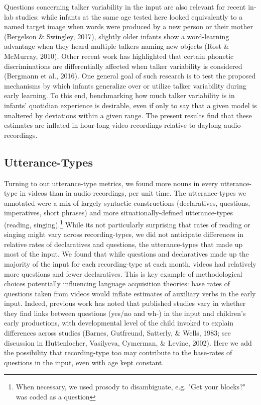 \documentclass[man]{apa6}
\theoremstyle{definition}
\theoremstyle{definition}
\theoremstyle{definition}
\theoremstyle{remark}
\begin{document}
Questions concerning talker variability in the input are also relevant
for recent in-lab studies: while infants at the same age tested here
looked equivalently to a named target image when words were produced by
a new person or their mother (Bergelson \& Swingley, 2017), slightly
older infants show a word-learning advantage when they heard multiple
talkers naming new objects (Rost \& McMurray, 2010). Other recent work
has highlighted that certain phonetic discriminations are differentially
affected when talker variability is considered (Bergmann et al., 2016).
One general goal of such research is to test the proposed mechanisms by
which infants generalize over or utilize talker variability during early
learning. To this end, benchmarking how much talker variability is in
infants' quotidian experience is desirable, even if only to say that a
given model is unaltered by deviations within a given range. The present
results find that these estimates are inflated in hour-long
video-recordings relative to daylong audio-recordings.

\subsection{Utterance-Types}\label{utterance-types}

Turning to our utterance-type metrics, we found more nouns in every
utterance-type in videos than in audio-recordings, per unit time. The
utterance-types we annotated were a mix of largely syntactic
constructions (declaratives, questions, imperatives, short phrases) and
more situationally-defined utterance-types (reading,
singing).\footnote{When necessary, we used prosody to disambiguate, e.g. "Get your blocks?" was coded as a question}
While its not particularly surprising that rates of reading or singing
might vary across recording-types, we did not anticipate differences in
relative rates of declaratives and questions, the utterance-types that
made up most of the input. We found that while questions and
declaratives made up the majority of the input for each recording-type
at each month, videos had relatively more questions and fewer
declaratives. This is key example of methodological choices potentially
influencing language acquisition theories: base rates of questions taken
from videos would inflate estimates of auxiliary verbs in the early
input. Indeed, previous work has noted that published studies vary in
whether they find links between questions (yes/no and wh-) in the input
and children's early productions, with developmental level of the child
invoked to explain differences across studies (Barnes, Gutfreund,
Satterly, \& Wells, 1983; see discussion in Huttenlocher, Vasilyeva,
Cymerman, \& Levine, 2002). Here we add the possibility that
recording-type too may contribute to the base-rates of questions in the
input, even with age kept constant.
\end{document}
